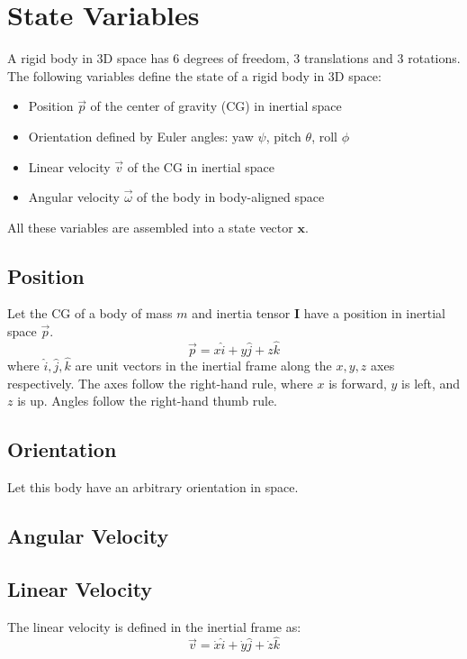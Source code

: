\section{State Variables}
A rigid body in 3D space has 6 degrees of freedom, 3 translations and 3 rotations. The following variables define the state of a rigid body in 3D space:
\begin{itemize}
    \item Position \( \vec{p} \) of the center of gravity (CG) in inertial space
    \item Orientation defined by Euler angles: yaw \( \psi \), pitch \( \theta \), roll \( \phi \)
    \item Linear velocity \( \vec{v} \) of the CG in inertial space
    \item Angular velocity \( \vec{\omega} \) of the body in body-aligned space
\end{itemize}
All these variables are assembled into a state vector \( \mathbf{x} \).

\subsection{Position}
Let the CG of a body of mass \( m \) and inertia tensor \( \mathbf{I} \) have a position in inertial space \(\vec{p}\).
\begin{equation}
    \vec{p} = x \hat{i} + y \hat{j} + z \hat{k}
\end{equation}
where \( \hat{i}, \hat{j}, \hat{k} \) are unit vectors in the inertial frame along the \( x, y, z \) axes respectively. The axes follow the right-hand rule, where \( x \) is forward, \( y \) is left, and \( z \) is up. Angles follow the right-hand thumb rule.

\subsection{Orientation}

Let this body have an arbitrary orientation in space.
\subsection{Angular Velocity}

\subsection{Linear Velocity}
The linear velocity is defined in the inertial frame as:
\begin{equation}
    \vec{v} = \dot{x} \hat{i} + \dot{y} \hat{j} + \dot{z} \hat{k}
\end{equation}

